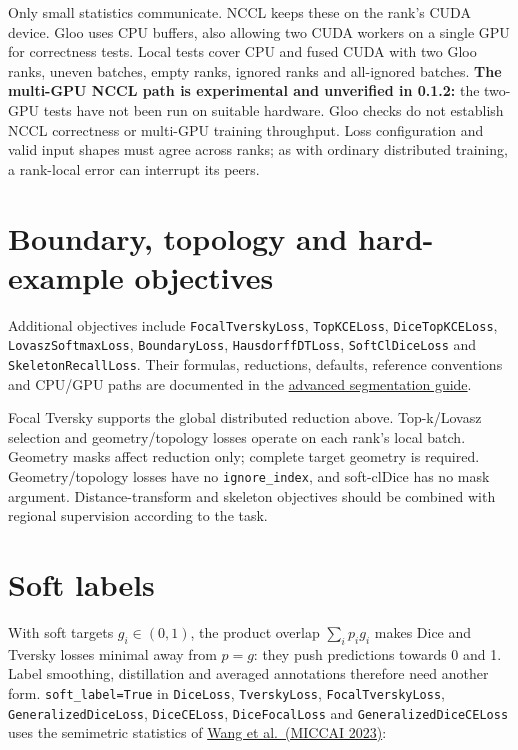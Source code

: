 Only small statistics communicate. NCCL keeps these on the rank's CUDA device. Gloo uses CPU
buffers, also allowing two CUDA workers on a single GPU for correctness tests. Local tests
cover CPU and fused CUDA with two Gloo ranks, uneven batches, empty ranks, ignored ranks and
all-ignored batches. \textbf{The multi-GPU NCCL path is experimental and unverified in 0.1.2:}
the two-GPU tests have not been run on suitable hardware. Gloo checks do not establish NCCL
correctness or multi-GPU training throughput. Loss configuration and valid input shapes
must agree across ranks; as with ordinary distributed training, a rank-local error can interrupt its peers.

\section{Boundary, topology and hard-example objectives}\label{losses:boundary-topology-and-hard-example-objectives}

Additional objectives include \texttt{FocalTverskyLoss}, \texttt{TopKCELoss}, \texttt{DiceTopKCELoss}, \texttt{LovaszSoftmaxLoss},
\texttt{BoundaryLoss}, \texttt{HausdorffDTLoss}, \texttt{SoftClDiceLoss} and \texttt{SkeletonRecallLoss}. Their formulas, reductions, defaults,
reference conventions and CPU/GPU paths are documented in the
\href{https://github.com/rodolfo-viana/exacta/wiki/Advanced-segmentation}{advanced segmentation guide}.

Focal Tversky supports the global distributed reduction above. Top-k/Lovasz selection and
geometry/topology losses operate on each rank's local batch. Geometry masks affect reduction
only; complete target geometry is required. Geometry/topology losses have no \texttt{ignore\_index},
and soft-clDice has no mask argument. Distance-transform and skeleton objectives should be
combined with regional supervision according to the task.

\section{Soft labels}\label{losses:soft-labels}

With soft targets \(g_i\in(0,1)\), the product overlap \(\sum_i p_i g_i\) makes Dice and Tversky
losses minimal away from \(p=g\): they push predictions towards 0 and 1. Label smoothing,
distillation and averaged annotations therefore need another form. \texttt{soft\_label=True} in
\texttt{DiceLoss}, \texttt{TverskyLoss}, \texttt{FocalTverskyLoss}, \texttt{GeneralizedDiceLoss}, \texttt{DiceCELoss},
\texttt{DiceFocalLoss} and \texttt{GeneralizedDiceCELoss} uses the semimetric statistics of
\href{https://doi.org/10.1007/978-3-031-43898-1_46}{Wang et al.~(MICCAI 2023)}:

